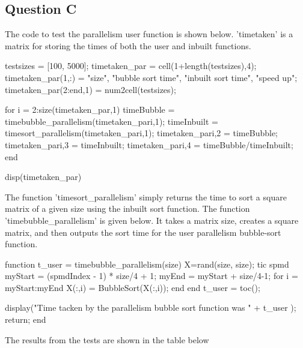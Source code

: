 \subsection{Question C}
The code to test the parallelism  user function is shown below.
'timetaken' is a matrix for storing the times of both the user and inbuilt functions.

\begin{Matlab}
 testsizes = [100, 5000];
 timetaken_par = cell(1+length(testsizes),4);
 timetaken_par(1,:) = {"size", "bubble sort time", "inbuilt sort time", "speed up"};
 timetaken_par(2:end,1) = num2cell(testsizes); 

 for i = 2:size(timetaken_par,1)
  timeBubble = timebubble_parallelism(timetaken_par{i,1});
  timeInbuilt = timesort_parallelism(timetaken_par{i,1});
  timetaken_par{i,2} = timeBubble;
  timetaken_par{i,3} = timeInbuilt;
  timetaken_par{i,4} = timeBubble/timeInbuilt;
 end

 disp(timetaken_par)
\end{Matlab}

The function 'timesort\_parallelism' simply returns the time to sort a square matrix of a given size using the inbuilt sort function.
The function 'timebubble\_parallelism' is given below.
It takes a matrix size, creates a square matrix, and then outputs the sort time for the user parallelism bubble-sort function.

\begin{Matlab}
function t_user = timebubble_parallelism(size)
    X=rand(size, size);
    tic
    spmd
        myStart = (spmdIndex - 1) * size/4 + 1;
        myEnd = myStart + size/4-1; 
        for i = myStart:myEnd
            X(:,i) = BubbleSort(X(:,i));
        end
    end
    t_user = toc();
    
    display("Time tacken by the parallelism bubble sort function was " + t_user );
    return;
end
\end{Matlab}

The results from the tests are shown in the table below


